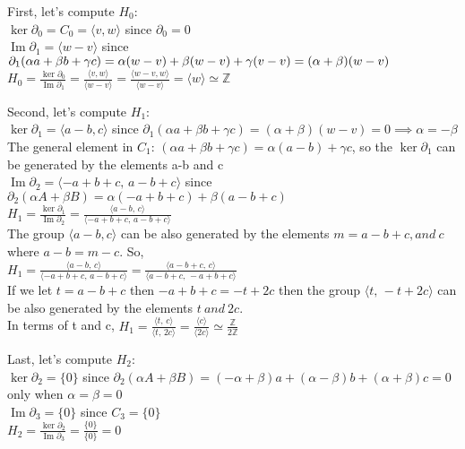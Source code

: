\documentclass[11pt,a4paper]{report}
\DeclareMathOperator{\Ima}{Im}
\begin{document}
\par
First, let's compute $H_0$: \\
$\ker\partial_0 = C_0 = \langle v,w \rangle$ 
		since $\partial_0 = 0$ \\ 
$\Ima\partial_1 = \langle w-v \rangle$ 
		since $\partial_1(\alpha a + \beta b + \gamma c) = \alpha (w-v) + \beta (w-v) + \gamma (v-v)  \\ =(\alpha + \beta)(w-v) $ \\
$H_0 = \frac{\ker\partial_0}{\Ima\partial_1} = \frac{ \langle v, w \rangle  }{ \langle w-v \rangle } = \frac{ \langle w-v, w \rangle  }{ \langle w-v \rangle }
                                                             =\langle w \rangle  \simeq \mathbb{Z}$ \\

\par
Second, let's compute $H_1$: \\
$\ker\partial_1 = \langle a-b,c \rangle$ 
		since $\partial_1(\alpha a + \beta b + \gamma c) = (\alpha + \beta)(w-v) = 0  \implies \alpha = -\beta$ \\
The general element in $C_1$: $ (\alpha a + \beta b + \gamma c)= \alpha(a-b) + \gamma c $,
so the $\ker\partial_1$ can be generated by the elements a-b and c \\
$\Ima\partial_2 = \langle -a+b+c,\, a-b+c \rangle $ 
		since $\partial_2(\alpha A + \beta B) = \alpha(-a+b+c) + \beta(a-b+c)$ \\
$H_1 = \frac{\ker\partial_1}{\Ima\partial_2} = 
		\frac{ \langle a-b, \,c \rangle  }{ \langle -a+b+c,\, a-b+c \rangle }$\\
The group $\langle a-b, c \rangle$ can be also generated by the elements 
		$ m=a-b+c, and \: c $ where $ a - b = m -c $. So, \\
$H_1 = \frac{ \langle a-b, \,c \rangle  }{ \langle -a+b+c,\, a-b+c \rangle } = \frac{ \langle a-b+c, \, c \rangle  }{ \langle a-b+c,\, -a+b+c \rangle } $ \\
If we let $t=a-b+c$ then $-a+b+c = -t + 2c $ then the group $\langle t,\, -t+2c \rangle$ can be also generated by the elements $ t \: and \: 2c $. \\
In terms of t and c, $H_1 = \frac{ \langle t, \,c \rangle  }{ \langle t,\, 2c \rangle } = \frac{  \langle c \rangle  }{ \langle 2c \rangle } \simeq \frac{\mathbb{Z}}{2\mathbb{Z}}$ \\

\par
Last, let's compute $H_2$: \\
$\ker\partial_2 = \{0\}$ 
		since $\partial_2(\alpha A + \beta B) = (-\alpha+\beta)a +  (\alpha-\beta)b + (\alpha+\beta)c = 0 $ only when $\alpha = \beta = 0$\\
$\Ima\partial_3 = \{0\}$ since $C_3 = \{0\}$ \\ 
$H_2 = \frac{\ker\partial_2}{\Ima\partial_3} = 
		\frac{\{0\} }{\{0\}} = 0 $ \\
\end{document}
